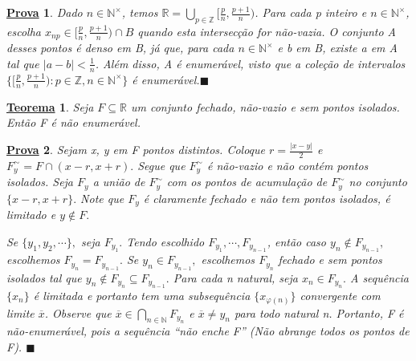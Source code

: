 \documentclass{article}
\newtheorem*{theorem*}{\underline{Teorema}}
\newtheorem*{proof*}{\underline{Prova}}
\renewcommand\qedsymbol{$\blacksquare$}
\begin{document}
\begin{proof*}
  Dado $n\in \mathbb{N}^{\times}$, temos $\mathbb{R} = \displaystyle\bigcup_{p\in \mathbb{Z}}^{}{\biggl[\frac{p}{n}, \frac{p+1}{n}\biggr)}$. Para
  cada p inteiro e $n\in \mathbb{N}^{\times}$, escolha $x_{np}\in\biggl[\frac{p}{n}, \frac{p+1}{n}\biggr)\cap{B}$ quando esta intersec\c c\~ao
  for n\~ao-vazia. O conjunto A desses pontos \'e denso em B, j\'a que, para cada $n\in \mathbb{N}^{\times}$ e b em B, existe a em A
  tal que $|a-b|<\frac{1}{n}$. Al\'em disso, A \'e enumer\'avel, visto que a cole\c c\~ao de intervalos $\biggl\{\biggl[\frac{p}{n}, \frac{p+1}{n}\biggr): p\in \mathbb{Z}, n\in \mathbb{N}^{\times}\biggr\}$
  \'e enumer\'avel.\qedsymbol
\end{proof*}
\begin{theorem*}
  Seja $F\subseteq{\mathbb{R}}$ um conjunto fechado, n\~ao-vazio e sem pontos isolados. Ent\~ao F \'e n\~ao enumer\'avel.
\end{theorem*}
\begin{proof*}
  Sejam x, y em F pontos distintos. Coloque $r = \frac{|x-y|}{2}$ e $F_{y}^{\sim} = F\cap{(x-r, x+r)}.$ Segue que $F_{y}^{\sim}$
\'e n\~ao-vazio e n\~ao cont\'em pontos isolados. Seja $F_{y}$ a uni\~ao de $F_{y}^{\sim}$ com os pontos de acumula\c c\~ao de 
$F_{y}^{\sim}$ no conjunto $\{x-r,x+r\}.$ Note que $F_{y}$ \'e claramente fechado e n\~ao tem pontos isolados, \'e limitado e
$y\not\in F.$

  Se $\{y_{1},y_{2},\cdots\},$ seja $F_{y_{1}}.$ Tendo escolhido $F_{y_{1}},\cdots, F_{y_{n-1}}$, ent\~ao caso $y_{n}\not\in F_{y_{n-1}},$ 
escolhemos $F_{y_{n}}=F_{y_{n-1}}.$ Se $y_{n}\in F_{y_{n-1}},$ escolhemos $F_{y_{n}}$ fechado e sem pontos isolados tal que 
$y_{n}\not\in F_{y_{n}}\subseteq{F_{y_{n-1}}}.$ Para cada n natural, seja $x_{n}\in F_{y_{n}}.$ A sequ\^encia $\{x_{n}\}$ \'e limitada
e portanto tem uma subsequ\^encia $\{x_{\varphi(n)}\}$ convergente com limite $\overline{x}$. Observe que $\overline{x}\in \bigcap_{n\in \mathbb{N}}^{}{F_{y_{n}}}$ 
e $\overline{x}\neq y_{n}$ para todo natural n. Portanto, F \'e n\~ao-enumer\'avel, pois a sequ\^encia ``n\~ao enche F'' (N\~ao abrange
todos os pontos de F). \qedsymbol
\end{proof*}
\end{document}

